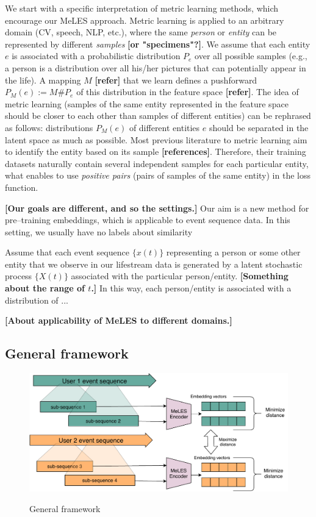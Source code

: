 \documentclass{article}
\newcommand{\nt}[1]{{\bf [#1]}}
\begin{document}
We start with a specific interpretation of metric learning methods, which encourage our MeLES approach. Metric learning is applied to an arbitrary domain (CV, speech, NLP, etc.), where the same \textit{person} or \textit{entity} can be represented by different \textit{samples} 
\nt{or "specimens"?}. We assume that each entity $e$ is associated with a probabilistic distribution $P_e$ over all possible samples (e.g., a person is a distribution over all his/her pictures that can potentially appear in the life). A mapping $M$ \nt{refer} that we learn defines a pushforward $P_M(e):=M\#P_e$ of this distribution in the feature space \nt{refer}. The idea of metric learning (samples of the same entity represented in the feature space should be closer to each other than samples of different entities) can be rephrased as follows: distributions $P_M(e)$ of different entities $e$ should be separated in the latent space as much as possible. Most previous literature to metric learning aim to identify the entity based on its sample \nt{references}. Therefore, their training datasets naturally contain several independent samples for each particular entity, what enables to use \textit{positive pairs} (pairs of samples of the same entity) in the loss function.

\nt{Our goals are different, and so the settings.}
Our aim is a new method for pre--training embeddings, which is applicable to event sequence data. In this setting, we usually have no labels about similarity  

Assume that each event sequence $\{x(t)\}$ representing a person or some other entity that we observe in our lifestream data is generated by a latent stochastic process $\{X(t)\}$ associated with the particular person/entity. \nt{Something about the range of $t$.} In this way, each person/entity is associated with a distribution of ...  

\nt{About applicability of MeLES to different domains.}

\subsection{General framework}

\begin{figure}[htbp]
  \caption{General framework}
  \includegraphics[width=\textwidth]{figures/arch-v2.pdf}
  \label{fig-arch}
\end{figure}
\end{document}
